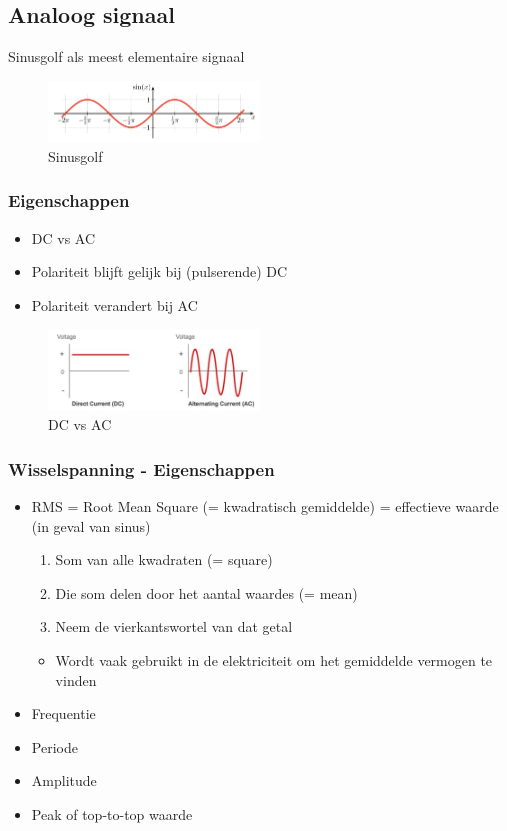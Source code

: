 \documentclass{article}
\begin{document}
\subsection{Analoog signaal}
Sinusgolf als meest elementaire signaal

\begin{figure}[H]
    \centering
    \includegraphics[width=0.5\textwidth]{Screenshot_20200315_113310.png}
    \caption{Sinusgolf}
\end{figure}

\subsubsection{Eigenschappen}
\begin{itemize}
    \item DC vs AC
    \item Polariteit blijft gelijk bij (pulserende) DC
    \item Polariteit verandert bij AC
\end{itemize}



\begin{figure}[H]
    \centering
    \includegraphics[width=0.5\textwidth]{Screenshot_20200217_121011.png}
    \caption{DC vs AC}
\end{figure}

\subsubsection{Wisselspanning - Eigenschappen}
\begin{itemize}
    \item RMS = Root Mean Square (= kwadratisch gemiddelde) = effectieve waarde (in geval van sinus)
    \begin{enumerate}
        \item Som van alle kwadraten (= square)
        \item Die som delen door het aantal waardes (= mean)
        \item Neem de vierkantswortel van dat getal
    \end{enumerate}
    \begin{itemize}
        \item Wordt vaak gebruikt in de elektriciteit om het gemiddelde vermogen te vinden
    \end{itemize}
    \item Frequentie
    \item Periode
    \item Amplitude
    \item Peak of top-to-top waarde
\end{itemize}
\end{document}
